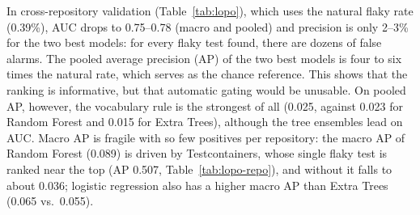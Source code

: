 In cross-repository validation (Table~\ref{tab:lopo}), which uses the natural flaky rate (0.39\%), AUC drops to 0.75--0.78 (macro and pooled) and precision is only 2--3\% for the two best models: for every flaky test found, there are dozens of false alarms. The pooled average precision (AP) of the two best models is four to six times the natural rate, which serves as the chance reference. This shows that the ranking is informative, but that automatic gating would be unusable. On pooled AP, however, the vocabulary rule is the strongest of all (0.025, against 0.023 for Random Forest and 0.015 for Extra Trees), although the tree ensembles lead on AUC. Macro AP is fragile with so few positives per repository: the macro AP of Random Forest (0.089) is driven by Testcontainers, whose single flaky test is ranked near the top (AP 0.507, Table~\ref{tab:lopo-repo}), and without it falls to about 0.036; logistic regression also has a higher macro AP than Extra Trees (0.065 vs.\ 0.055). 

